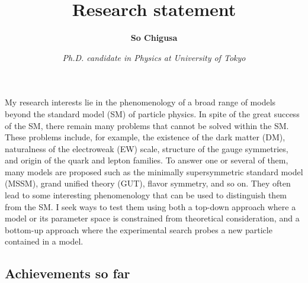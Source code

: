 \documentclass[12pt,notitlepage]{article}
\title{\vspace*{-3cm}Research statement}
\author{\textbf{So Chigusa}}
\date{\vspace*{-4mm}\textit{Ph.D. candidate in Physics at University of Tokyo}}
\begin{document}
\maketitle

My research interests lie in the phenomenology of a broad range of models beyond the standard model (SM) of particle physics.
In spite of the great success of the SM, there remain many problems that cannot be solved within the SM.
These problems include, for example, the existence of the dark matter (DM), naturalness of the electroweak (EW) scale, structure of the gauge symmetries, and origin of the quark and lepton families.
To answer one or several of them, many models are proposed such as the minimally supersymmetric standard model (MSSM), grand unified theory (GUT), flavor symmetry, and so on.
They often lead to some interesting phenomenology that can be used to distinguish them from the SM.
I seek ways to test them using both a top-down approach where a model or its parameter space is constrained from theoretical consideration, and a bottom-up approach where the experimental search probes a new particle contained in a model.

\vspace*{-2mm}
\subsection*{Achievements so far}

\end{document}

